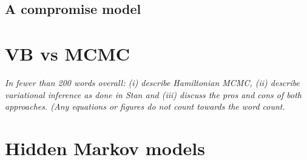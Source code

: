 \documentclass[11pt,a4paper]{article}
\begin{document}
  \subsection{A compromise model}
  

\section{VB vs MCMC}

\textit{In fewer than 200 words overall: (i) describe Hamiltonian MCMC, (ii) describe variational inference as done in Stan and (iii) discuss the pros and cons of both approaches. (Any equations or figures do not count towards the word count.}

\section{Hidden Markov models}
\end{document}
